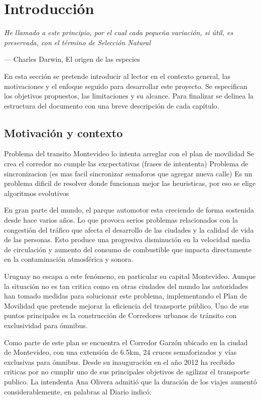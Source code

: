\chapter{Introducción}
\epigraph{ \textit{He llamado a este principio, por el cual cada pequeña variación, si útil, es preservada, con el término de Selección Natural}}{--- Charles Darwin, El origen de las especies}

En esta sección se pretende introducir al lector en el contexto general, las motivaciones y el enfoque seguido para desarrollar este proyecto. Se especifican los objetivos propuestos, las limitaciones y su alcance. Para finalizar se delinea la estructura del documento con una breve descripción de cada capítulo. 

\section{Motivación y contexto}
Problema del transito
Montevideo lo intenta arreglar con el plan de movilidad
Se crea el corredor
no cumple las excpectativas (frases de intententa)
Problema de sincronizacion (es mas facil sincronizar semaforos que agregar nueva calle)
Es un problema dificil de resolver donde funcionan mejor las heuristicas, por eso se elige algoritmos evolutivos


En gran parte del mundo, el parque automotor esta creciendo de forma sostenida desde hace varios años. Lo que provoca serios problemas relacionados con la congestión del tráfico que afecta el desarrollo de las ciudades y la calidad de vida de las personas. Esto produce una progresiva disminución en la velocidad media de circulación y aumento del consumo de combustible que impacta directamente en la contaminación atmosférica y sonora.

Uruguay no escapa a este fenómeno, en particular su capital Montevideo. Aunque la situación no es tan critica como en otras ciudades del mundo las autoridades han tomado medidas para solucionar este problema, implementando el Plan de Movilidad que pretende mejorar la eficiencia del transporte público. Uno de sus puntos principales es la construcción de Corredores urbanos de tránsito con exclusividad para ómnibus.

Como parte de este plan se encuentra el Corredor Garzón ubicado en la ciudad de Montevideo, con una extensión de 6.5km, 24 cruces semaforizados y vías exclusivas para ómnibus. Desde su inauguración en el año 2012 ha recibido criticas por no cumplir uno de sus principales objetivos de agilizar el transporte publico. La intendenta Ana Olivera admitió que la duración de los viajes aumentó considerablemente, en palabras al Diario \cite{olivera2015} indicó: 


